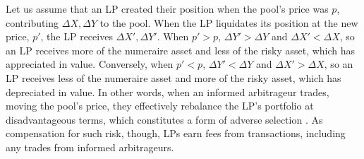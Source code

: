 \documentclass[11pt]{article}
\begin{document}
Let us assume that an LP created their position when the pool's price was $p$, contributing $\Delta X, \Delta Y$ to the pool. When the LP liquidates its position at the new price, $p'$, the LP receives $\Delta X', \Delta Y'$. When $p' > p$, $\Delta Y' > \Delta Y$ and $\Delta X' < \Delta X$, so an LP receives more of the numeraire asset and less of the risky asset, which has appreciated in value. Conversely, when $p' < p$, $\Delta Y' < \Delta Y$ and $\Delta X' > \Delta X$, so an LP receives less of the numeraire asset and more of the risky asset, which has depreciated in value. In other words, when an informed arbitrageur trades, moving the pool's price, they effectively rebalance the LP's portfolio at disadvantageous terms, which constitutes a form of adverse selection \citep{Lehar2021DecentralizedE}.
As compensation for such risk, though, LPs earn fees from transactions, including any trades from informed arbitrageurs.
\end{document}
